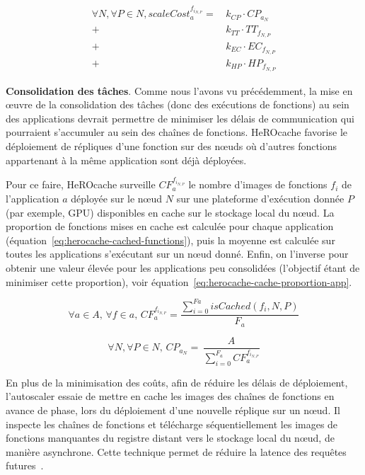 {\begin{equation}
\begin{split}
 \forall N, \forall P \in N, scaleCost^{{f}_{{i}_{N, P}}}_{a} = \,   &k_{CP} \cdot {CP}_{{a}_{N}}    \\
    + &k_{TT} \cdot {TT}_{{f}_{N, P}} \\
    + &k_{EC} \cdot {EC}_{{f}_{N, P}} \\
    + &k_{HP} \cdot {HP}_{{f}_{N, P}}
\end{split}
\label{eq:herocache-scale-cost-function}
\end{equation}

\textbf{Consolidation des tâches}. Comme nous l'avons vu précédemment, la mise en œuvre de la consolidation des tâches (donc des exécutions de fonctions) au sein des applications devrait permettre de minimiser les délais de communication qui pourraient s'accumuler au sein des chaînes de fonctions. HeROcache favorise le déploiement de répliques d'une fonction sur des nœuds où d'autres fonctions appartenant à la même application sont déjà déployées.

Pour ce faire, HeROcache surveille $CF_{a}^{{f}_{i_{N, P}}}$ le nombre d'images de fonctions ${f}_{i}$ de l'application $a$ déployée sur le nœud $N$ sur une plateforme d'exécution donnée $P$ (par exemple, GPU) disponibles en cache sur le stockage local du nœud. La proportion de fonctions mises en cache est calculée pour chaque application (équation~\ref{eq:herocache-cached-functions}), puis la moyenne est calculée sur toutes les applications s'exécutant sur un nœud donné. Enfin, on l'inverse pour obtenir une valeur élevée pour les applications peu consolidées (l'objectif étant de minimiser cette proportion), voir équation~\ref{eq:herocache-cache-proportion-app}.

\begin{equation}
    \forall a \in A, \, \forall f \in a, \, CF_{a}^{{f}_{i_{N, P}}} = \frac{\sum_{i = 0}^{Fa} isCached(f_{i}, N, P)}{F_{a}}
\label{eq:herocache-cached-functions}
\end{equation}

\begin{equation}
    \forall N, \forall P \in N, \, {CP}_{{a}_{N}} = \, \frac{A}{\sum_{i = 0}^{F_{a}} CF_{a}^{{f}_{i_{N, P}}}}
\label{eq:herocache-cache-proportion-app}
\end{equation}

En plus de la minimisation des coûts, afin de réduire les délais de déploiement, l'autoscaler essaie de mettre en cache les images des chaînes de fonctions en avance de phase, lors du déploiement d'une nouvelle réplique sur un nœud. Il inspecte les chaînes de fonctions et télécharge séquentiellement les images de fonctions manquantes du registre distant vers le stockage local du nœud, de manière asynchrone. Cette technique permet de réduire la latence des requêtes futures~\cite{leeSPESOptimizingPerformanceResource2024a}.

}
